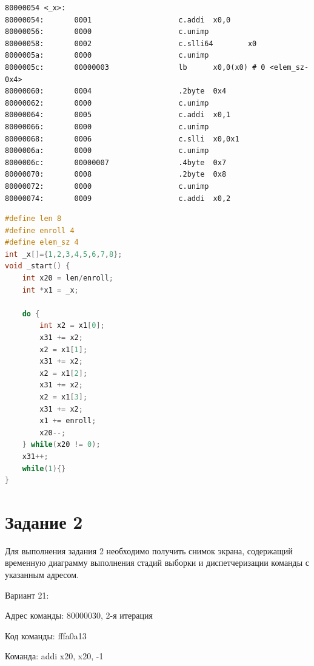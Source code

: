 \begin{lstlisting}[label={common_disasm}, language={RISC-V}, caption=Дизассеблированный код программы для варианта 21]
80000054 <_x>:
80000054:       0001                    c.addi  x0,0
80000056:       0000                    c.unimp
80000058:       0002                    c.slli64        x0
8000005a:       0000                    c.unimp
8000005c:       00000003                lb      x0,0(x0) # 0 <elem_sz-0x4>
80000060:       0004                    .2byte  0x4
80000062:       0000                    c.unimp
80000064:       0005                    c.addi  x0,1
80000066:       0000                    c.unimp
80000068:       0006                    c.slli  x0,0x1
8000006a:       0000                    c.unimp
8000006c:       00000007                .4byte  0x7
80000070:       0008                    .2byte  0x8
80000072:       0000                    c.unimp
80000074:       0009                    c.addi  x0,2
\end{lstlisting}

\clearpage

\begin{lstlisting}[label={common_c}, language={C}, caption=Псевдокод на языке C эквивалентной программы]
#define len 8
#define enroll 4
#define elem_sz 4
int _x[]={1,2,3,4,5,6,7,8};
void _start() {
    int x20 = len/enroll;
    int *x1 = _x;

    do {
        int x2 = x1[0];
        x31 += x2;
        x2 = x1[1];
        x31 += x2;
        x2 = x1[2];
        x31 += x2;
        x2 = x1[3];
        x31 += x2;
        x1 += enroll;
        x20--;
    } while(x20 != 0);
    x31++;
    while(1){}
}
\end{lstlisting}

\clearpage

\section{Задание 2}

Для выполнения задания 2 необходимо получить снимок экрана, 
содер\-жащий временную диаграмму выполнения стадий выборки и 
диспетчериза\-ции команды с указанным адресом.

Вариант 21:

\hspace{1cm} Адрес команды: 80000030, 2-я итерация

\hspace{1cm} Код команды: fffa0a13

\hspace{1cm} Команда: addi x20, x20, -1

